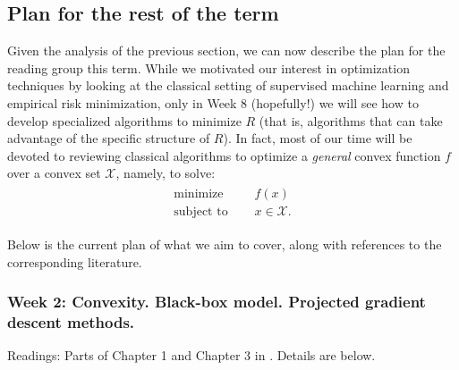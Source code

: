 \subsection{Plan for the rest of the term}

Given the analysis of the previous section, we can now describe the plan for the reading group this term.
While we motivated our interest in optimization techniques by looking at the classical setting of supervised machine learning and empirical risk minimization, only in Week 8 (hopefully!) we will see how to develop specialized algorithms to minimize $R$ (that is, algorithms that can take advantage of the specific structure of $R$). In fact, most of our time will be devoted to reviewing classical algorithms to optimize a \emph{general} convex function $f$ over a convex set $\mathcal{X}$, namely, to solve:
\begin{align*}
	\begin{aligned}
		\text{minimize }\quad   & f(x)\\
		\text{subject to }\quad & x\in\mathcal{X}.
	\end{aligned}
\end{align*}


Below is the current plan of what we aim to cover, along with references to the corresponding literature.\\



\subsubsection*{Week 2: Convexity. Black-box model. Projected gradient descent methods.}
Readings: Parts of Chapter 1 and Chapter 3 in \cite{bubeck}. Details are below.\\

